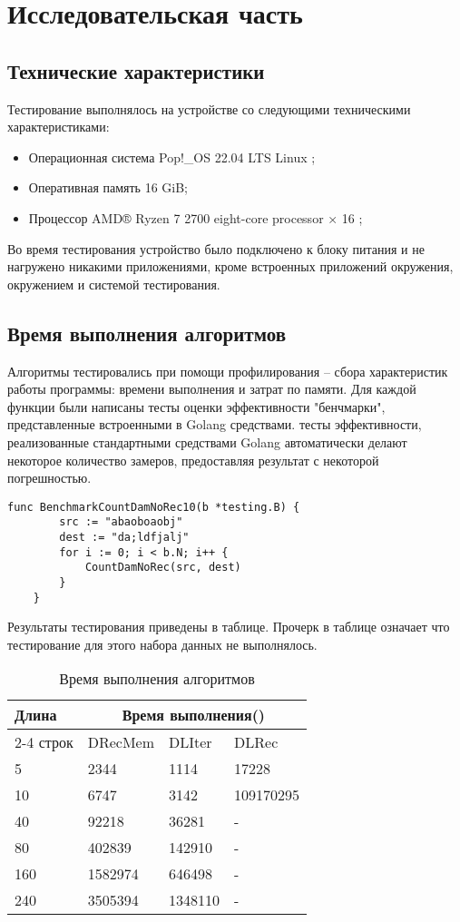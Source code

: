 \chapter{Исследовательская часть}
\section{Технические характеристики}
Тестирование выполнялось на устройстве со следующими техническими характеристиками:
\begin{itemize}
	\item Операционная система Pop!\_OS 22.04 LTS \cite{ubuntu} Linux \cite{linux};
	\item Оперативная память 16 GiB;
	\item Процессор AMD® Ryzen 7 2700 eight-core processor × 16 \cite{amd};
\end{itemize}
Во время тестирования устройство было подключено к блоку питания и не нагружено никакими приложениями, кроме встроенных приложений окружения, окружением и системой тестирования.
\section{Время выполнения алгоритмов}
Алгоритмы тестировались при помощи профилирования -- сбора характеристик работы программы: времени выполнения и затрат по памяти. Для каждой функции были написаны тесты оценки эффективности "бенчмарки"\cite{test}, представленные встроенными в Golang средствами. тесты эффективности, реализованные стандартными средствами Golang автоматически делают некоторое количество замеров, предоставляя результат с некоторой погрешностью.
\begin{lstlisting}[label=bench,caption=Пример теста эффективности]
	func BenchmarkCountDamNoRec10(b *testing.B) {
		src := "abaoboaobj"
		dest := "da;ldfjalj"
		for i := 0; i < b.N; i++ {
			CountDamNoRec(src, dest)
		}
	}
\end{lstlisting}

Результаты тестирования приведены в таблице. Прочерк в таблице означает что тестирование для этого набора данных не выполнялось.


\begin{table}[h!]
	\begin{center}
		\caption{Время выполнения алгоритмов}
		\begin{tabular}{ ||p{1.5cm}||p{2cm}|p{2cm}|p{3.5cm}||  }
			\hline
			\multirow{2}{*}{Длина}& \multicolumn{3}{c||}{Время выполнения()} \\[1.5ex]
			\cline{2-4} 
			строк& DRecMem & DLIter & DLRec \\ [1.5ex] 
			\hline\hline
			5  & 2344 & 1114 & 17228 \\
			10 & 6747 & 3142 & 109170295 \\
			40 & 92218 & 36281 & - \\
			80 & 402839 & 142910 & - \\
			160 & 1582974 & 646498 & - \\
			240 & 3505394 & 1348110 & - \\
			\hline
		\end{tabular}
		\label{time-table}
	\end{center}
\end{table}

